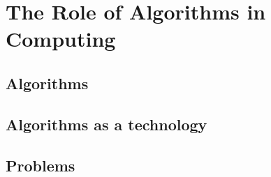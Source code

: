 \chapter{The Role of Algorithms in Computing}
  \section{Algorithms}
    
    

  \section{Algorithms as a technology}
%    
%    

  \section{Problems}
    
%    
